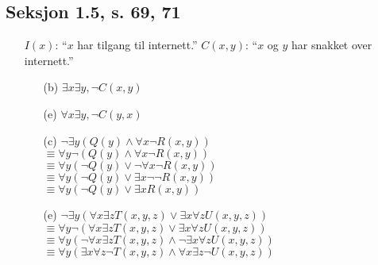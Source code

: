 \documentclass[a4paper, 12pt]{article}  %
\begin{document}
\subsection*{Seksjon 1.5, s. 69, 71}
\begin{enumerate}
    \item [\boxed{12}] $I(x)$: ``$x$ har tilgang til internett.'' $C(x,y)$: ``$x$ og $y$ har snakket over internett.''
          \begin{enumerate}
              \item [(b)] $\exists x \exists y, \neg C(x,y)$
              \item [(e)] $\forall x \exists y, \neg C(y,x)$
          \end{enumerate}
    \item [\boxed{30}]
          \begin{enumerate}
              \item [(c)] $\neg \exists y (Q(y) \land \forall x \neg R(x,y))$ \\
                    $\equiv \forall y \neg (Q(y) \land \forall x \neg R(x,y))$ \\
                    $\equiv \forall y (\neg Q(y) \lor \neg \forall x \neg R(x,y))$ \\
                    $\equiv \forall y (\neg Q(y) \lor \exists x \neg \neg R(x,y))$ \\
                    $\equiv \forall y (\neg Q(y) \lor \exists x R(x,y))$ \\
              \item[(e)] $\neg \exists y (\forall x \exists z T(x,y,z) \lor \exists x \forall z U(x,y,z))$ \\
                    $\equiv \forall y \neg (\forall x \exists z T(x,y,z) \lor \exists x \forall z U(x,y,z))$ \\
                    $\equiv \forall y (\neg \forall x \exists z T(x,y,z) \land \neg \exists x \forall z U(x,y,z))$ \\
                    $\equiv \forall y (\exists x \forall z \neg T(x,y,z) \land \forall x \exists z \neg U(x,y,z))$ \\
          \end{enumerate}
\end{enumerate}
\end{document}
